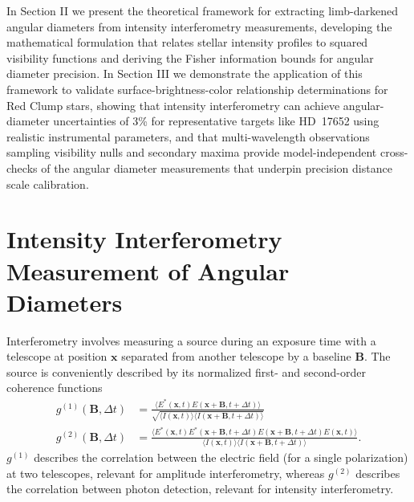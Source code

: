 \documentclass[linenumbers,trackchanges,margins]{aastex701}
\begin{document}
In Section II we present the theoretical framework for extracting limb-darkened angular diameters from intensity interferometry measurements, developing the mathematical formulation that relates stellar intensity profiles to squared visibility functions and deriving the Fisher information bounds for angular diameter precision. In Section III we demonstrate the application of this framework to validate surface-brightness-color relationship determinations for Red Clump stars, showing that intensity interferometry can achieve angular-diameter uncertainties of 3\% for representative targets like HD~17652 using realistic instrumental parameters, and that multi-wavelength observations sampling visibility nulls and secondary maxima provide model-independent cross-checks of the angular diameter measurements that underpin precision distance scale calibration.

\section{Intensity Interferometry Measurement of Angular Diameters}
Interferometry involves measuring a source during an exposure time with a telescope at position $\mathbf{x}$ separated from another telescope by a baseline $\mathbf{B}$.
The source is conveniently described by its normalized first- and second-order coherence functions
\begin{align}
    g^{(1)}(\mathbf{B},\Delta t) & = \frac{\langle E^*(\mathbf{x},t) E(\mathbf{x}+\mathbf{B}, t+\Delta t)\rangle}
    {\sqrt{\langle I(\mathbf{x},t)\rangle \langle I(\mathbf{x}+\mathbf{B}, t+\Delta t)\rangle}}\\
    g^{(2)}(\mathbf{B},\Delta t) & = \frac{\langle E^*(\mathbf{x},t)  E^*(\mathbf{x}+\mathbf{B}, t+\Delta t) E(\mathbf{x}+\mathbf{B}, t+\Delta t) E(\mathbf{x},t) \rangle}
    {\langle I(\mathbf{x},t)\rangle \langle I(\mathbf{x}+\mathbf{B}, t+\Delta t)\rangle}.
\end{align}
$g^{(1)}$ describes the correlation between the electric field (for a single polarization) at two telescopes, relevant for amplitude interferometry,
whereas $g^{(2)}$ describes the correlation between photon detection, relevant for intensity interferometry.
\end{document}
